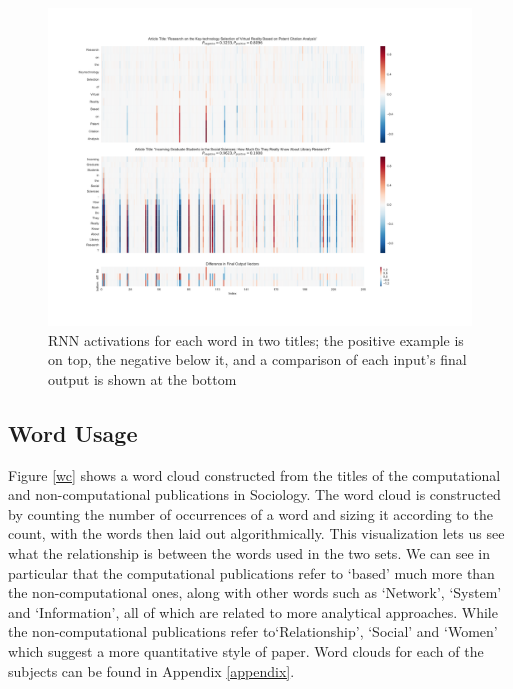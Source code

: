 \documentclass[12pt, a4paper]{article}
\begin{document}
\begin{figure}[ht]
	\centering
		\includegraphics[width=\textwidth]{visualize}
	\caption{RNN activations for each word in two titles; the positive example is on top, the negative below it, and a comparison of each input's final output is shown at the bottom}\label{visualize}
\end{figure}

\subsection{Word Usage}\label{word_count}

Figure \ref{wc} shows a word cloud constructed from the titles of the computational and non-computational publications in Sociology. The word cloud is constructed by counting the number of occurrences of a word and sizing it according to the count, with the words then laid out algorithmically. This visualization lets us see what the relationship is between the words used in the two sets. We can see in particular that the computational publications refer to `based' much more than the non-computational ones, along with other words such as `Network', `System' and `Information', all of which are related to more analytical approaches. While the non-computational publications refer to`Relationship', `Social' and `Women' which suggest a more quantitative style of paper. Word clouds for each of the subjects can be found in Appendix \ref{appendix}.
\end{document}
